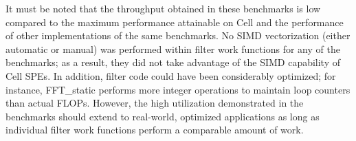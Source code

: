 It must be noted that the throughput obtained in these benchmarks is low
compared to the maximum performance attainable on Cell and the performance of other
implementations of the same benchmarks.
No SIMD vectorization (either automatic or manual) was performed within
filter work functions for any of the benchmarks;
as a result, they did not take advantage of the SIMD capability of Cell SPEs.
In addition, filter code could have been considerably optimized; for instance,
\textsf{FFT\_static} performs more integer operations to maintain loop counters than actual FLOPs.
However, the high utilization demonstrated in the benchmarks should extend to
real-world, optimized applications as long as individual filter work functions
perform a comparable amount of work.
